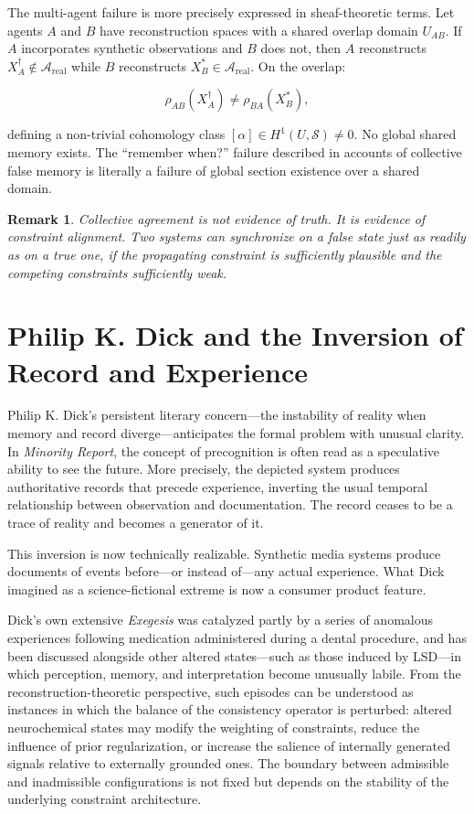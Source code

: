 \documentclass[12pt, letterpaper]{article}
\theoremstyle{flyxion}
\newtheorem*{remark}{Remark}
\begin{document}
The multi-agent failure is more precisely expressed in sheaf-theoretic terms. Let agents $A$ and $B$ have reconstruction spaces with a shared overlap domain $U_{AB}$. If $A$ incorporates synthetic observations and $B$ does not, then $A$ reconstructs $X_A^\dagger \notin \mathcal{A}_\mathrm{real}$ while $B$ reconstructs $X_B^* \in \mathcal{A}_\mathrm{real}$. On the overlap:

\begin{equation}
\rho_{AB}(X_A^\dagger) \neq \rho_{BA}(X_B^*),
\end{equation}

defining a non-trivial cohomology class $[\alpha] \in H^1(U, \mathcal{S}) \neq 0$. No global shared memory exists. The ``remember when?'' failure described in accounts of collective false memory is literally a failure of global section existence over a shared domain.

\begin{remark}
Collective agreement is not evidence of truth. It is evidence of constraint alignment. Two systems can synchronize on a false state just as readily as on a true one, if the propagating constraint is sufficiently plausible and the competing constraints sufficiently weak.
\end{remark}

\section{Philip K. Dick and the Inversion of Record and Experience}

Philip K. Dick's persistent literary concern---the instability of reality when memory and record diverge---anticipates the formal problem with unusual clarity. In \textit{Minority Report}, the concept of precognition is often read as a speculative ability to see the future. More precisely, the depicted system produces authoritative records that precede experience, inverting the usual temporal relationship between observation and documentation. The record ceases to be a trace of reality and becomes a generator of it.

This inversion is now technically realizable. Synthetic media systems produce documents of events before---or instead of---any actual experience. What Dick imagined as a science-fictional extreme is now a consumer product feature.

Dick's own extensive \textit{Exegesis} was catalyzed partly by a series of anomalous experiences following medication administered during a dental procedure, and has been discussed alongside other altered states---such as those induced by LSD---in which perception, memory, and interpretation become unusually labile. From the reconstruction-theoretic perspective, such episodes can be understood as instances in which the balance of the consistency operator is perturbed: altered neurochemical states may modify the weighting of constraints, reduce the influence of prior regularization, or increase the salience of internally generated signals relative to externally grounded ones. The boundary between admissible and inadmissible configurations is not fixed but depends on the stability of the underlying constraint architecture.
\end{document}
